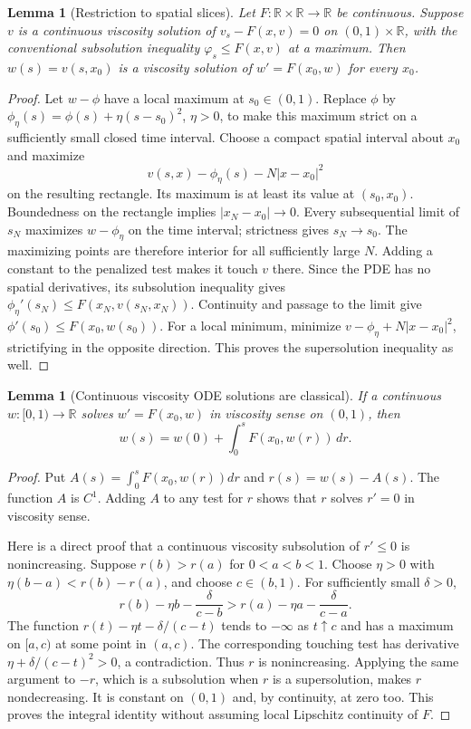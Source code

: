 \documentclass[11pt,a4paper]{article}
\newcommand{\R}{\mathbb R}
\newtheorem{lemma}[theorem]{Lemma}
\theoremstyle{definition}
\begin{document}
\begin{lemma}[Restriction to spatial slices]
Let $F:\R\times\R\to\R$ be continuous. Suppose $v$ is a continuous viscosity solution of
$v_s-F(x,v)=0$ on $(0,1)\times\R$, with the conventional subsolution inequality $\varphi_s\le F(x,v)$ at a maximum. Then $w(s)=v(s,x_0)$ is a viscosity solution of $w'=F(x_0,w)$ for every $x_0$.
\end{lemma}
\begin{proof}
Let $w-\phi$ have a local maximum at $s_0\in(0,1)$. Replace $\phi$ by $\phi_\eta(s)=\phi(s)+\eta(s-s_0)^2$, $\eta>0$, to make this maximum strict on a sufficiently small closed time interval. Choose a compact spatial interval about $x_0$ and maximize
\[
 v(s,x)-\phi_\eta(s)-N|x-x_0|^2
\]
on the resulting rectangle. Its maximum is at least its value at $(s_0,x_0)$. Boundedness on the rectangle implies $|x_N-x_0|\to0$. Every subsequential limit of $s_N$ maximizes $w-\phi_\eta$ on the time interval; strictness gives $s_N\to s_0$. The maximizing points are therefore interior for all sufficiently large $N$. Adding a constant to the penalized test makes it touch $v$ there. Since the PDE has no spatial derivatives, its subsolution inequality gives
$\phi_\eta'(s_N)\le F(x_N,v(s_N,x_N))$. Continuity and passage to the limit give $\phi'(s_0)\le F(x_0,w(s_0))$. For a local minimum, minimize $v-\phi_\eta+N|x-x_0|^2$, strictifying in the opposite direction. This proves the supersolution inequality as well.
\end{proof}

\begin{lemma}[Continuous viscosity ODE solutions are classical]
If a continuous $w:[0,1)\to\R$ solves $w'=F(x_0,w)$ in viscosity sense on $(0,1)$, then
\[
 w(s)=w(0)+\int_0^s F(x_0,w(r))\,dr.
\]
\end{lemma}
\begin{proof}
Put $A(s)=\int_0^s F(x_0,w(r))dr$ and $r(s)=w(s)-A(s)$. The function $A$ is $C^1$. Adding $A$ to any test for $r$ shows that $r$ solves $r'=0$ in viscosity sense.

Here is a direct proof that a continuous viscosity subsolution of $r'\le0$ is nonincreasing. Suppose $r(b)>r(a)$ for $0<a<b<1$. Choose $\eta>0$ with $\eta(b-a)<r(b)-r(a)$, and choose $c\in(b,1)$. For sufficiently small $\delta>0$,
\[
 r(b)-\eta b-\frac\delta{c-b}
 >r(a)-\eta a-\frac\delta{c-a}.
\]
The function $r(t)-\eta t-\delta/(c-t)$ tends to $-\infty$ as $t\uparrow c$ and has a maximum on $[a,c)$ at some point in $(a,c)$. The corresponding touching test has derivative $\eta+\delta/(c-t)^2>0$, a contradiction. Thus $r$ is nonincreasing. Applying the same argument to $-r$, which is a subsolution when $r$ is a supersolution, makes $r$ nondecreasing. It is constant on $(0,1)$ and, by continuity, at zero too. This proves the integral identity without assuming local Lipschitz continuity of $F$.
\end{proof}
\end{document}
